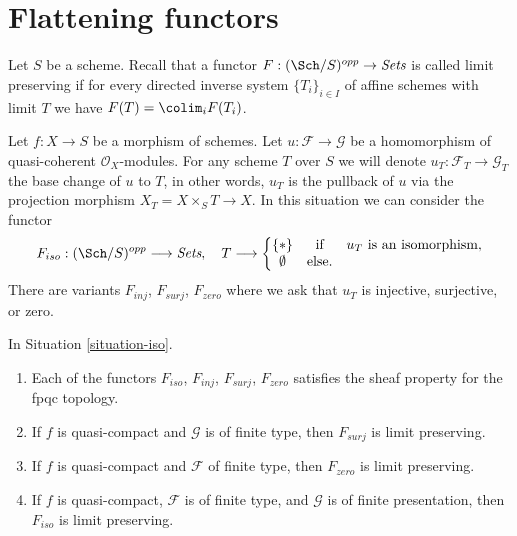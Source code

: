 \section{Flattening functors}
\label{section-flattening-functors}

\noindent
Let $S$ be a scheme. Recall that a functor
$F : (\Sch/S)^{opp} \to \textit{Sets}$ is called limit preserving
if for every directed inverse system
$\{T_i\}_{i \in I}$ of affine schemes with limit $T$ we have
$F(T) = \colim_i F(T_i)$.

\begin{situation}
\label{situation-iso}
Let $f : X \to S$ be a morphism of schemes.
Let $u : \mathcal{F} \to \mathcal{G}$ be a homomorphism of
quasi-coherent $\mathcal{O}_X$-modules. For any scheme $T$ over
$S$ we will denote $u_T : \mathcal{F}_T \to \mathcal{G}_T$ the
base change of $u$ to $T$, in other words, $u_T$ is the pullback
of $u$ via the projection morphism $X_T = X \times_S T \to X$.
In this situation we can consider the functor
\begin{equation}
\label{equation-iso}
F_{iso} : (\Sch/S)^{opp} \longrightarrow \textit{Sets}, \quad
T \longrightarrow \left\{
\begin{matrix}
\{*\} & \text{if} & u_T \text{ is an isomorphism}, \\
\emptyset & \text{else.} &
\end{matrix}
\right.
\end{equation}
There are variants $F_{inj}$, $F_{surj}$, $F_{zero}$ where we ask that
$u_T$ is injective, surjective, or zero.
\end{situation}

\begin{lemma}
\label{lemma-iso-sheaf}
In Situation \ref{situation-iso}.
\begin{enumerate}
\item Each of the functors $F_{iso}$, $F_{inj}$, $F_{surj}$, $F_{zero}$
satisfies the sheaf property for the fpqc topology.
\item If $f$ is quasi-compact and $\mathcal{G}$ is of finite type,
then $F_{surj}$ is limit preserving.
\item If $f$ is quasi-compact and $\mathcal{F}$ of finite type, then
$F_{zero}$ is limit preserving.
\item If $f$ is quasi-compact, $\mathcal{F}$ is of finite type, and
$\mathcal{G}$ is of finite presentation, then $F_{iso}$ is limit preserving.
\end{enumerate}
\end{lemma}

